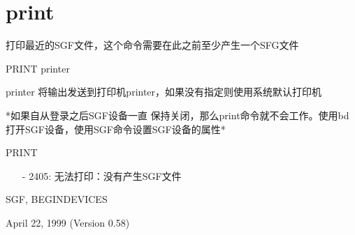\section{print}
\label{cmd:print}

打印最近的SGF文件，这个命令需要在此之前至少产生一个SFG文件

PRINT {printer}

printer 将输出发送到打印机printer，如果没有指定则使用系统默认打印机

*如果自从登录之后SGF设备一直 保持关闭，那么print命令就不会工作。使用bd打开SGF设备，使用SGF命令设置SGF设备的属性*

PRINT

\begin{itemize}
\item[-]2405: 无法打印：没有产生SGF文件
\end{itemize}

SGF, BEGINDEVICES

April 22, 1999 (Version 0.58)
